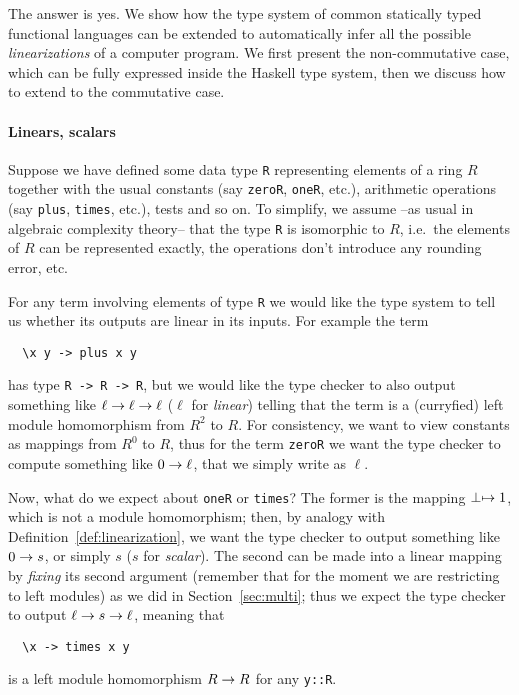 The answer is yes. We show how the type system of common statically
typed functional languages can be extended to automatically infer all
the possible \emph{linearizations} of a computer
program. We first present the non-commutative case, which can be fully
expressed inside the Haskell type system, then we discuss how to
extend to the commutative case.

\paragraph{Linears, scalars}
\label{sec:linears-scalars}
Suppose we have defined some data type \lstinline{R} representing
elements of a ring $R$ together with the usual constants (say
\lstinline{zeroR}, \lstinline{oneR}, etc.), arithmetic operations (say
\lstinline{plus}, \lstinline{times}, etc.), tests and so on. To
simplify, we assume --as usual in algebraic complexity theory-- that
the type \lstinline{R} is isomorphic to $R$, i.e.\ the elements of $R$
can be represented exactly, the operations don't introduce any
rounding error, etc.

For any term involving elements of type \lstinline{R} we would like
the type system to tell us whether its outputs are linear in its
inputs. For example the term
\begin{lstlisting}
  \x y -> plus x y
\end{lstlisting}
has type \lstinline{R -> R -> R}, but we would like the type checker
to also output something like $\ell\rightarrow\ell\rightarrow\ell$ ($\ell$ for
\emph{linear}) telling that the term is a
(curryfied) left module homomorphism from $R^2$ to $R$. For
consistency, we want to view constants as mappings from $R^0$ to $R$,
thus for the term \lstinline{zeroR} we want the type checker to
compute something like $0\rightarrow\ell$, that we simply write as $\ell$.

Now, what do we expect about \lstinline{oneR} or \lstinline{times}?
The former is the mapping $\perp\mapsto1$, which is not a module
homomorphism; then, by analogy with
Definition~\ref{def:linearization}, we want the type checker to output
something like $0\rightarrow s$, or simply $s$ ($s$ for
\emph{scalar}). The second can be made into a
linear mapping by \emph{fixing} its second argument (remember that for
the moment we are restricting to left modules) as we did in
Section~\ref{sec:multi}; thus we expect the type checker to output
$\ell\rightarrow s\rightarrow\ell$, meaning that
\begin{lstlisting}
  \x -> times x y
\end{lstlisting}
is a left module homomorphism $R\rightarrow R$ for any \lstinline{y::R}.

